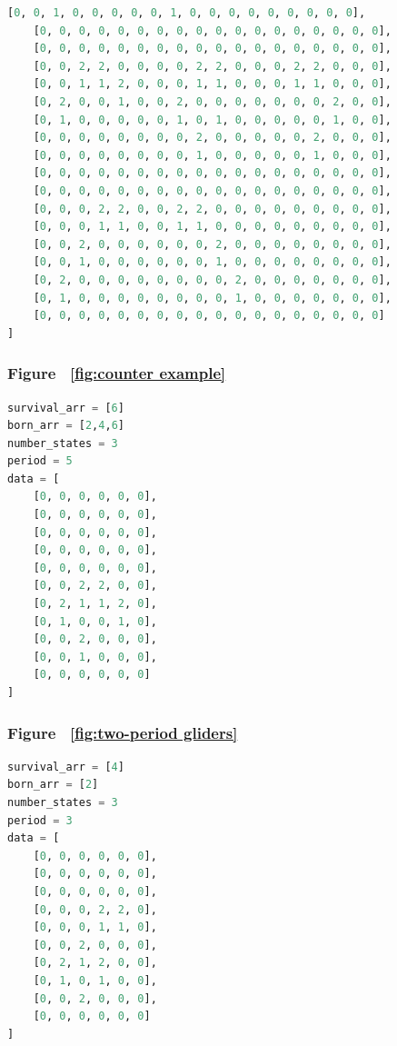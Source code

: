 \documentclass[12pt]{article}
\numberwithin{figure}{section} %
\begin{document}
\begin{lstlisting}[language = Python]
    [0, 0, 1, 0, 0, 0, 0, 0, 1, 0, 0, 0, 0, 0, 0, 0, 0, 0],
    [0, 0, 0, 0, 0, 0, 0, 0, 0, 0, 0, 0, 0, 0, 0, 0, 0, 0],
    [0, 0, 0, 0, 0, 0, 0, 0, 0, 0, 0, 0, 0, 0, 0, 0, 0, 0],  
    [0, 0, 2, 2, 0, 0, 0, 0, 2, 2, 0, 0, 0, 2, 2, 0, 0, 0],
    [0, 0, 1, 1, 2, 0, 0, 0, 1, 1, 0, 0, 0, 1, 1, 0, 0, 0],
    [0, 2, 0, 0, 1, 0, 0, 2, 0, 0, 0, 0, 0, 0, 0, 2, 0, 0],
    [0, 1, 0, 0, 0, 0, 0, 1, 0, 1, 0, 0, 0, 0, 0, 1, 0, 0],
    [0, 0, 0, 0, 0, 0, 0, 0, 2, 0, 0, 0, 0, 0, 2, 0, 0, 0],
    [0, 0, 0, 0, 0, 0, 0, 0, 1, 0, 0, 0, 0, 0, 1, 0, 0, 0],
    [0, 0, 0, 0, 0, 0, 0, 0, 0, 0, 0, 0, 0, 0, 0, 0, 0, 0],
    [0, 0, 0, 0, 0, 0, 0, 0, 0, 0, 0, 0, 0, 0, 0, 0, 0, 0], 
    [0, 0, 0, 2, 2, 0, 0, 2, 2, 0, 0, 0, 0, 0, 0, 0, 0, 0],
    [0, 0, 0, 1, 1, 0, 0, 1, 1, 0, 0, 0, 0, 0, 0, 0, 0, 0],
    [0, 0, 2, 0, 0, 0, 0, 0, 0, 2, 0, 0, 0, 0, 0, 0, 0, 0],
    [0, 0, 1, 0, 0, 0, 0, 0, 0, 1, 0, 0, 0, 0, 0, 0, 0, 0],
    [0, 2, 0, 0, 0, 0, 0, 0, 0, 0, 2, 0, 0, 0, 0, 0, 0, 0],
    [0, 1, 0, 0, 0, 0, 0, 0, 0, 0, 1, 0, 0, 0, 0, 0, 0, 0],
    [0, 0, 0, 0, 0, 0, 0, 0, 0, 0, 0, 0, 0, 0, 0, 0, 0, 0] 
]
\end{lstlisting}
\noindent\begin{minipage}{.45\textwidth}
\subsubsection{Figure ~\ref{fig:counter example}}
\label{subsubsection:counter example}
\begin{lstlisting}[language = Python]
survival_arr = [6]
born_arr = [2,4,6]
number_states = 3
period = 5
data = [
    [0, 0, 0, 0, 0, 0],
    [0, 0, 0, 0, 0, 0],
    [0, 0, 0, 0, 0, 0],
    [0, 0, 0, 0, 0, 0],
    [0, 0, 0, 0, 0, 0],
    [0, 0, 2, 2, 0, 0], 
    [0, 2, 1, 1, 2, 0], 
    [0, 1, 0, 0, 1, 0], 
    [0, 0, 2, 0, 0, 0], 
    [0, 0, 1, 0, 0, 0], 
    [0, 0, 0, 0, 0, 0]
]
\end{lstlisting}
\end{minipage}
\hfill
\begin{minipage}{.45\textwidth}
\subsubsection{Figure ~\ref{fig:two-period gliders}}
\label{subsubsection:two-period gliders(1/5)}
\begin{lstlisting}[language = Python]
survival_arr = [4]
born_arr = [2]
number_states = 3
period = 3
data = [
    [0, 0, 0, 0, 0, 0],
    [0, 0, 0, 0, 0, 0],
    [0, 0, 0, 0, 0, 0],
    [0, 0, 0, 2, 2, 0],
    [0, 0, 0, 1, 1, 0],
    [0, 0, 2, 0, 0, 0],
    [0, 2, 1, 2, 0, 0],
    [0, 1, 0, 1, 0, 0],
    [0, 0, 2, 0, 0, 0],
    [0, 0, 0, 0, 0, 0]
]
\end{lstlisting}
\end{minipage}
\end{document}
